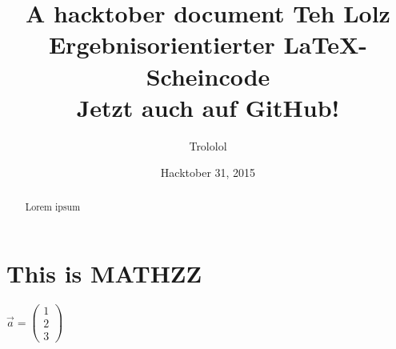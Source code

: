 \documentclass{article}
\title{A hacktober document}
\author{Trololol}
\date{Hacktober 31, 2015}
\title{
    Teh Lolz\\
  \vspace{7mm}
    Ergebnisorientierter {\LaTeX}-Scheincode\\
  \vspace{1cm}
  \large {
        Jetzt auch auf GitHub!\\
      \vspace{1cm}
    }
}
\begin{document}
	\maketitle	

	\thispagestyle{empty}
	\begin{abstract}
		Lorem ipsum
	\end{abstract}
	
	\newpage
	
	\section{This is MATHZZ}
	$
		\vec{a} =
		\begin{pmatrix}
		1 \\
		2 \\
		3
		\end{pmatrix}
	$
\end{document}
